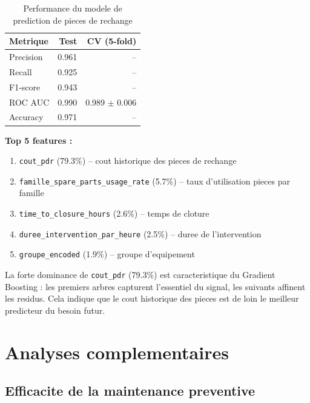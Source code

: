 \documentclass[12pt,a4paper]{article}
\begin{document}
\begin{table}[H]
\centering
\begin{tabular}{lrr}
\toprule
\textbf{Metrique} & \textbf{Test} & \textbf{CV (5-fold)} \\
\midrule
Precision & 0.961 & -- \\
Recall & 0.925 & -- \\
F1-score & 0.943 & -- \\
ROC AUC & 0.990 & 0.989 $\pm$ 0.006 \\
Accuracy & 0.971 & -- \\
\bottomrule
\end{tabular}
\caption{Performance du modele de prediction de pieces de rechange}
\end{table}

\textbf{Top 5 features :}
\begin{enumerate}
  \item \texttt{cout\_pdr} (79.3\%) -- cout historique des pieces de rechange
  \item \texttt{famille\_spare\_parts\_usage\_rate} (5.7\%) -- taux d'utilisation pieces par famille
  \item \texttt{time\_to\_closure\_hours} (2.6\%) -- temps de cloture
  \item \texttt{duree\_intervention\_par\_heure} (2.5\%) -- duree de l'intervention
  \item \texttt{groupe\_encoded} (1.9\%) -- groupe d'equipement
\end{enumerate}

La forte dominance de \texttt{cout\_pdr} (79.3\%) est caracteristique du Gradient Boosting : les premiers arbres capturent l'essentiel du signal, les suivants affinent les residus. Cela indique que le cout historique des pieces est de loin le meilleur predicteur du besoin futur.

\section{Analyses complementaires}

\subsection{Efficacite de la maintenance preventive}
\end{document}
